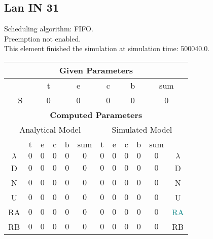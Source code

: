 \documentclass{article}
\begin{document}
\subsection{Lan IN 31}
Scheduling algorithm: FIFO.\\Preemption not enabled. \\This element finished the simulation at simulation time: 500040.0.\\
\begin{table}[H]\centering\begin{tabular}{@{}c|cccc|c||cccc|c|c@{}}\toprule\multicolumn{12}{c}{\textbf{Given Parameters}}\\\midrule\multicolumn{2}{c|}{ } & \multicolumn{2}{c}{t} & \multicolumn{2}{c}{e} & \multicolumn{2}{c}{c} & \multicolumn{2}{c}{b} & \multicolumn{2}{|c}{sum} \\ \midrule\multicolumn{2}{c|}{S} & \multicolumn{2}{c}{0} & \multicolumn{2}{c}{0} & \multicolumn{2}{c}{0} & \multicolumn{2}{c}{0} & \multicolumn{2}{|c}{0}\\ \midrule\midrule\multicolumn{12}{c}{\textbf{Computed Parameters}}\\ \midrule\multicolumn{6}{c||}{Analytical Model} & \multicolumn{6}{c}{Simulated Model}\\ 
 \midrule & t & e & c & b & sum & t & e & c & b & sum &  \\ \midrule$\lambda$ &$0$ & $0$ & $0$ & $0$ & $0$ & $0$ & $0$ & $0$ & $0$ & $0$& $\lambda$ \\D & $0$ & $0$ & $0$ & $0$ & $0$ & $0$ & $0$ & $0$ & $0$ & $0$& D\\N & $0$ & $0$ & $0$ & $0$ & $0$ & $0$ & $0$ & $0$ & $0$ & $0$& N\\U & $0$ & $0$ & $0$ & $0$ & $0$ & $0$ & $0$ & $0$ & $0$ & $0$& U\\RA & $0$ & $0$ & $0$ & $0$ & $0$ & $0$ & $0$ & $0$ & $0$ & $0$& \textcolor{teal}{RA}\\RB & $0$ & $0$ & $0$ & $0$ & $0$ & $0$ & $0$ & $0$ & $0$ & $0$& RB\\
\bottomrule
\end{tabular}
\end{table}
\filbreak
\end{document}
